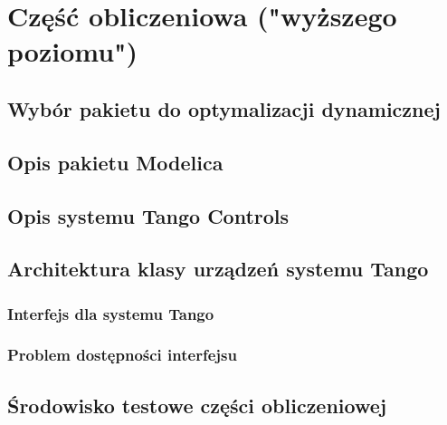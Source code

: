 \section{Część obliczeniowa ("wyższego poziomu")}
\label{sec:czesc-wyzsza}


\subsection{Wybór pakietu do optymalizacji dynamicznej}
\label{sub:czesc-wyzsza-wybor}


\subsection{Opis pakietu Modelica}
\label{sub:czesc-wyzsza-modelica}


\subsection{Opis systemu Tango Controls}
\label{sub:czesc-wyzsza-tango}


\subsection{Architektura klasy urządzeń systemu Tango}
\label{sub:czesc-wyzsza-klasa}


\subsubsection{Interfejs dla systemu Tango}


\subsubsection{Problem dostępności interfejsu}


\subsection{Środowisko testowe części obliczeniowej}
\label{sub:czesc-wyzsza-docker}